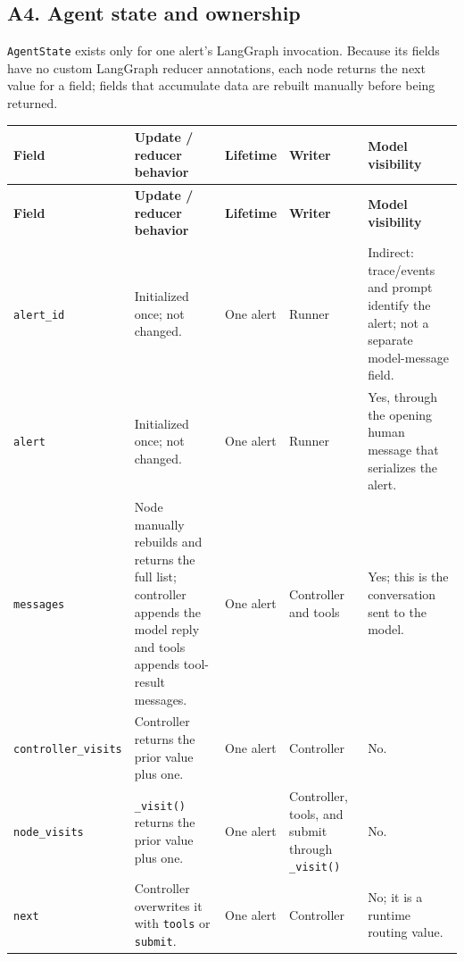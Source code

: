 \documentclass[11pt]{article}
\begin{document}
\clearpage
\begin{landscape}
\subsection*{A4. Agent state and ownership}
\texttt{AgentState} exists only for one alert's LangGraph invocation. Because its fields have no custom LangGraph reducer annotations, each node returns the next value for a field; fields that accumulate data are rebuilt manually before being returned.

{\small
\renewcommand{\arraystretch}{1.28}
\setlength{\tabcolsep}{3pt}
\begin{longtable}{@{}>{\raggedright\arraybackslash}p{} >{\raggedright\arraybackslash}p{} >{\raggedright\arraybackslash}p{} >{\raggedright\arraybackslash}p{} >{\raggedright\arraybackslash}p{}@{}}
\toprule
\textbf{Field} & \textbf{Update / reducer behavior} & \textbf{Lifetime} & \textbf{Writer} & \textbf{Model visibility} \\
\midrule
\endfirsthead
\toprule
\textbf{Field} & \textbf{Update / reducer behavior} & \textbf{Lifetime} & \textbf{Writer} & \textbf{Model visibility} \\
\midrule
\endhead
\texttt{alert\_id} & Initialized once; not changed. & One alert & Runner & Indirect: trace/events and prompt identify the alert; not a separate model-message field. \\ \midrule
\texttt{alert} & Initialized once; not changed. & One alert & Runner & Yes, through the opening human message that serializes the alert. \\ \midrule
\texttt{messages} & Node manually rebuilds and returns the full list; controller appends the model reply and tools appends tool-result messages. & One alert & Controller and tools & Yes; this is the conversation sent to the model. \\ \midrule
\texttt{controller}\newline\texttt{\_visits} & Controller returns the prior value plus one. & One alert & Controller & No. \\ \midrule
\texttt{node\_visits} & \texttt{\_visit()} returns the prior value plus one. & One alert & Controller, tools, and submit through \texttt{\_visit()} & No. \\ \midrule
\texttt{next} & Controller overwrites it with \texttt{tools} or \texttt{submit}. & One alert & Controller & No; it is a runtime routing value. \\ \midrule

\end{longtable}}
\end{landscape}
\end{document}
